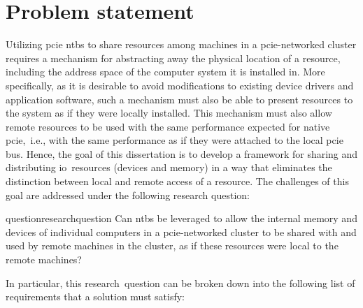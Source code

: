 



\section{Problem statement}\label{sec:problem}
Utilizing \gls{pcie} \glspl{ntb} to share resources among machines in a \gls{pcie}-networked cluster requires a mechanism for abstracting away the physical location of a resource, including the address space of the computer system it is installed in. 
%
More specifically, as it is desirable to avoid modifications to existing device drivers and application software, such a mechanism must also be able to present resources to the system as if they were locally installed.
%
This mechanism must also allow remote resources to be used with the same performance expected for native \gls{pcie},~i.e., with the same performance as if they were attached to the local \gls{pcie} bus.
%
Hence, the goal of this dissertation is to develop a framework for sharing and distributing \gls{io}~resources (devices and memory) in a way that eliminates the distinction between local and remote access of a resource. 
%
The challenges of this goal are addressed under the following research question: 
\begin{restatable}{question}{researchquestion}\label{question}
    Can \glspl{ntb} be leveraged to allow the internal memory and devices of individual computers in a \gls{pcie}-networked cluster to be shared with and used by remote machines in the cluster, as if these resources were local to the remote machines?
\end{restatable}
%
In particular, this research~question can be broken down into the following list of requirements that a solution must satisfy:


